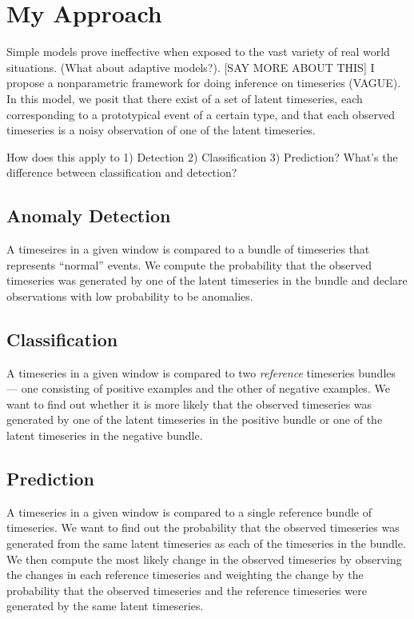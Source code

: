 \section{My Approach}
Simple models prove ineffective when exposed to the vast variety of real world situations. (What about adaptive models?). [SAY MORE ABOUT THIS] I propose a nonparametric framework for doing inference on timeseries (VAGUE). In this model, we posit that there exist of a set of latent timeseries, each corresponding to a prototypical event of a certain type, and that each observed timeseries is a noisy observation of one of the latent timeseries.

How does this apply to 1) Detection 2) Classification 3) Prediction? What's the difference between classification and detection?

\subsection{Anomaly Detection}
A timeseires in a given window is compared to a bundle of timeseries that represents ``normal'' events. We compute the probability that the observed timeseries was generated by one of the latent timeseries in the bundle and declare observations with low probability to be anomalies.

\subsection{Classification}
A timeseries in a given window is compared to two {\em reference} timeseries bundles --- one consisting of positive examples and the other of negative examples. We want to find out whether it is more likely that the observed timeseries was generated by one of the latent timeseries in the positive bundle or one of the latent timeseries in the negative bundle.

\subsection{Prediction} A timeseries in a given window is compared to a single reference bundle of timeseries. We want to find out the probability that the observed timeseries was generated from the same latent timeseries as each of the timeseries in the bundle. We then compute the most likely change in the observed timeseries by observing the changes in each reference timeseries and weighting the change by the probability that the observed timeseries and the reference timeseries were generated by the same latent timeseries.
 
